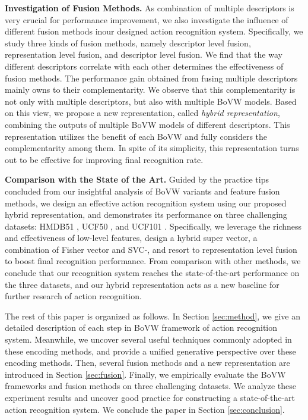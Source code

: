 \documentclass[twocolumn]{svjour3}          \smartqed  \usepackage{slashbox}
\begin{document}
\textbf{Investigation of Fusion Methods.} As combination of multiple descriptors is very crucial for performance improvement, we also investigate the influence of different fusion methods inour designed action recognition system. Specifically, we study three kinds of fusion methods, namely descriptor level fusion, representation level fusion, and descriptor level fusion. We find that the way different descriptors correlate with each other determines the effectiveness of fusion methods. The performance gain obtained from fusing multiple descriptors mainly owns to their complementarity. We observe that this complementarity is not only with multiple descriptors, but also with multiple BoVW models. Based on this view, we propose a new representation, called \emph{hybrid representation}, combining the outputs of multiple BoVW models of different descriptors. This representation utilizes the benefit of each BoVW and fully considers the complementarity among them. In spite of its simplicity, this representation turns out to be effective for improving final recognition rate.

\textbf{Comparison with the State of the Art.} Guided by the practice tips concluded from our insightful analysis of BoVW variants and feature fusion methods, we design an effective action recognition system using our proposed hybrid representation, and demonstrates its performance on three challenging datasets: HMDB51 \cite{KuehneJGPS11}, UCF50 \cite{ReddyS13}, and UCF101 \cite{SOOMRO12}. Specifically, we leverage the richness and effectiveness of low-level features, design a hybrid super vector, a combination of Fisher vector \cite{PerronninSM10} and SVC-, and resort to representation level fusion to boost final recognition performance. From comparison with other methods, we conclude that our recognition system reaches the state-of-the-art performance on the three datasets, and our hybrid representation acts as a new baseline for further research of action recognition.

The rest of this paper is organized as follows. In Section \ref{sec:method}, we give an detailed description of each step in BoVW framework of action recognition system. Meanwhile, we uncover several useful techniques commonly adopted in these encoding methods, and provide a unified generative perspective over these encoding methods. Then, several fusion methods and a new representation are introduced in Section \ref{sec:fusion}. Finally, we empirically evaluate the BoVW frameworks and fusion methods on three challenging datasets. We analyze these experiment results and uncover good practice for constructing a state-of-the-art action recognition system. We conclude the paper in Section \ref{sec:conclusion}.
\end{document}
